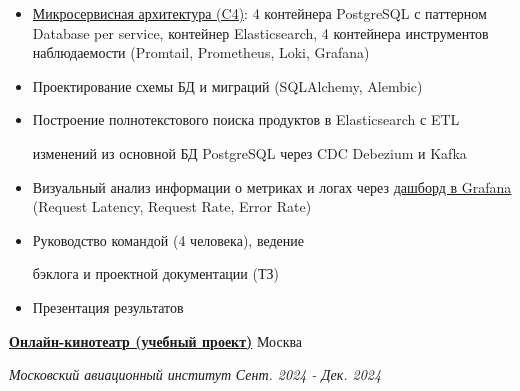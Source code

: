 \documentclass[14pt, a4paper, oneside]{extarticle}
\begin{document}
\begin{itemize}
	\vspace{-2\intextsep}
	\item \href{https://github.com/Crazy5202/job_application_form/tree/main/portfolio/eComm_C4.pdf}{Микросервисная архитектура (C4)}: 4 контейнера PostgreSQL с паттерном Database per service, контейнер Elasticsearch, 4 контейнера инструментов наблюдаемости (Promtail, Prometheus, Loki, Grafana) 
	\vspace{-0.8\intextsep}
	\item Проектирование схемы БД и миграций (SQLAlchemy, Alembic)
	\vspace{-0.8\intextsep}
	\item Построение полнотекстового поиска продуктов в Elasticsearch с ETL
	
	\vspace{-0.5\intextsep} 
	изменений из основной БД PostgreSQL через CDC Debezium и Kafka
	\vspace{-0.8\intextsep}
	\item Визуальный анализ информации о метриках и логах через \href{https://github.com/Crazy5202/job_application_form/tree/main/portfolio/eComm_Grafana.pdf}{дашборд в Grafana} (Request Latency, Request Rate, Error Rate)
	\vspace{-0.8\intextsep}
    \item Руководство командой (4 человека), ведение 

    \vspace{-0.5\intextsep}
    бэклога и проектной документации (ТЗ)
    \vspace{-0.8\intextsep}
    \item Презентация результатов
\end{itemize}


\begin{flushleft}
	\vspace{-\intextsep}
	\quad
	\href{https://github.com/Crazy5202/Python_project}{\textbf{Онлайн-кинотеатр (учебный проект)}}
	\hfill
	Москва
\end{flushleft}

\begin{flushleft}
	\vspace{-1\intextsep}
	\quad
	\textit{Московский авиационный институт}
	\hfill
	\textit{\small Сент. 2024 - Дек. 2024}
\end{flushleft}

\end{document}
